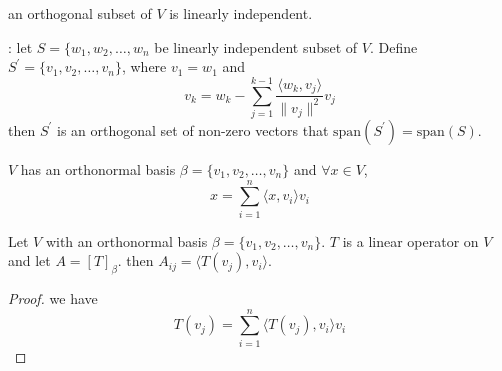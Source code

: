 \begin{theorem}
	an orthogonal subset of $V$ is linearly independent.
\end{theorem}

\begin{definition}
	: let $S=\{w_1, w_2, \dots, w_n$ be linearly independent subset of $V$. Define $S^\prime=\{v_1,v_2,\dots,v_n  \}$, where $v_1=w_1$ and 
	\begin{equation}
		v_k = w_k - \sum_{j=1}^{k-1} \frac{\langle w_k,v_j \rangle}{\|v_j\|^2} v_j
	\end{equation}
	then $S^\prime$ is an orthogonal set of non-zero vectors that $\text{span}(S^\prime) = \text{span}(S)$.
\end{definition}

\begin{theorem}
	$V$ has an orthonormal basis $\beta=\{v_1,v_2,\dots,v_n\}$ and $\forall x\in V$, 
	\begin{equation}
		x = \sum_{i=1}^n \langle x,v_i \rangle v_i
	\end{equation}
\end{theorem}

\begin{theorem}
	Let $V$ with an orthonormal basis $\beta=\{v_1,v_2,\dots,v_n\}$. $T$ is a linear operator on $V$ and let $A=[T]_\beta$. then $A_{ij}=\langle T(v_j), v_i\rangle$.
\end{theorem}
\begin{proof}
	we have
	\begin{equation*}
		T(v_j) = \sum_{i=1}^n \langle T(v_j), v_i \rangle v_i
	\end{equation*}
\end{proof}

























